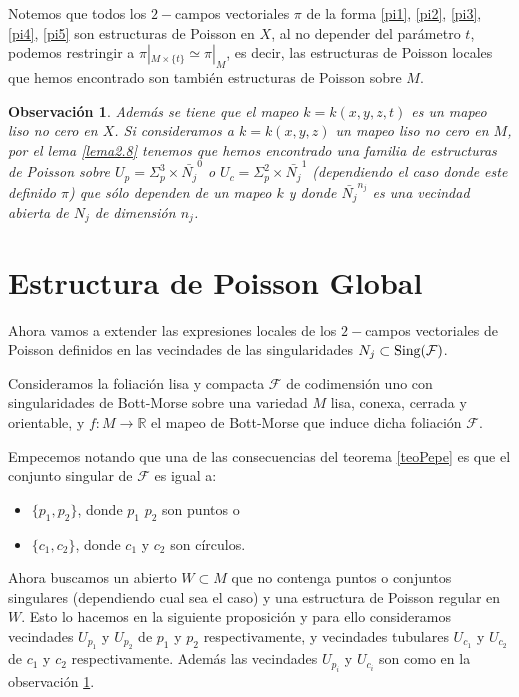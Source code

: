 \documentclass[a4paper,10pt]{book}
\newtheorem{obs}{Observaci\'on}
\begin{document}
Notemos que todos los $2-$campos vectoriales $\pi$ de la forma \ref{pi1}, \ref{pi2}, \ref{pi3}, \ref{pi4}, \ref{pi5} son estructuras de Poisson en $X$, al no depender del par\'ametro $t$, podemos restringir a $\pi|_{M\times\{t\}}\simeq\pi|_{M}$, es decir, las estructuras de Poisson locales que hemos encontrado son tambi\'en estructuras de Poisson sobre $M$.  

\begin{obs}\label{obsUcUp}
Adem\'as se tiene que el mapeo $k=k(x,y,z,t)$ es un mapeo liso no cero en $X$. Si consideramos a $k=k(x,y,z)$ un mapeo liso no cero en $M$, por el lema \ref{lema2.8} tenemos que hemos encontrado una familia de estructuras de Poisson sobre $U_{p}=\Sigma_{p}^{3}\times\bar{N_{j}}^{0}$ o $U_{c}=\Sigma_{p}^{2}\times\bar{N_{j}}^{1}$ (dependiendo el caso donde este definido $\pi$) que s\'olo dependen de un mapeo $k$ y donde $\bar{N_{j}}^{n_{j}}$ es una vecindad abierta de $N_{j}$ de dimensi\'on $n_{j}$.  
\end{obs}


\section{Estructura de Poisson Global}\label{3.2}

Ahora vamos a extender las expresiones locales de los $2-$campos vectoriales de Poisson definidos en las vecindades de las singularidades $N_{j}\subset{\rm Sing(\mathcal{F})}$.
\vspace{5mm}

Consideramos la foliaci\'on lisa y compacta $\mathcal{F}$ de codimensi\'on uno con singularidades de Bott-Morse sobre una variedad $M$ lisa, conexa, cerrada y orientable, y $f:M\to\mathbb{R}$ el mapeo de Bott-Morse que induce dicha foliaci\'on $\mathcal{F}$.
\vspace{5mm}

Empecemos notando que una de las consecuencias del teorema \ref{teoPepe} es que el conjunto singular de $\mathcal{F}$ es igual a:
\begin{itemize}
    \item  $\{p_{1},p_{2}\}$, donde $p_{1}$ $p_{2}$ son puntos o 
    \item  $\{c_{1}, c_{2}\}$, donde $c_{1}$ y $c_{2}$ son c\'irculos.
\end{itemize}
Ahora buscamos un abierto $W\subset M$ que no contenga puntos o conjuntos singulares (dependiendo cual sea el caso) y una estructura de Poisson regular en $W$. Esto lo hacemos en la siguiente proposici\'on y para ello consideramos vecindades $U_{p_{1}}$ y $U_{p_{2}}$ de $p_{1}$ y $p_{2}$ respectivamente, y vecindades tubulares $U_{c_{1}}$ y $U_{c_{2}}$ de $c_{1}$ y $c_{2}$ respectivamente. Adem\'as las vecindades $U_{p_{i}}$ y $U_{c_{i}}$ son como en la observaci\'on \ref{obsUcUp}.
\end{document}
